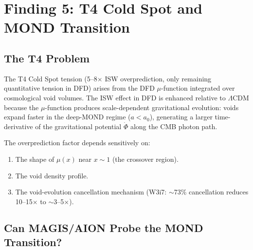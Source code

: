 \documentclass[11pt]{article}
\theoremstyle{definition}
\theoremstyle{remark}
\newcommand{\azero}{a_0}
\begin{document}
\section{Finding 5: T4 Cold Spot and MOND Transition}
\label{sec:T4}

\subsection{The T4 Problem}

The T4 Cold Spot tension (5--8$\times$ ISW overprediction, only remaining
quantitative tension in DFD) arises from the DFD $\mu$-function integrated
over cosmological void volumes. The ISW effect in DFD is enhanced relative
to $\Lambda$CDM because the $\mu$-function produces scale-dependent
gravitational evolution: voids expand faster in the deep-MOND regime
($a < \azero$), generating a larger time-derivative of the gravitational
potential $\dot{\Phi}$ along the CMB photon path.

The overprediction factor depends sensitively on:
\begin{enumerate}[nosep]
\item The shape of $\mu(x)$ near $x \sim 1$ (the crossover region).
\item The void density profile.
\item The void-evolution cancellation mechanism (W3i7: $\sim$73\%
  cancellation reduces 10--15$\times$ to $\sim$3--5$\times$).
\end{enumerate}

\subsection{Can MAGIS/AION Probe the MOND Transition?}
\end{document}
